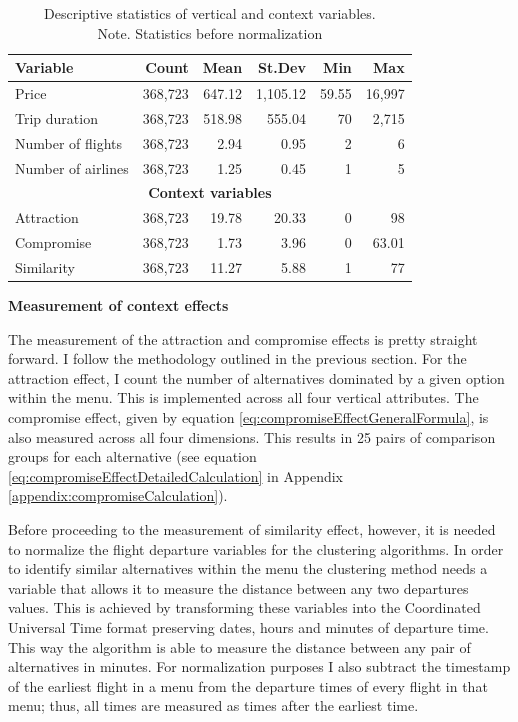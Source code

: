 \documentclass[a4paper,12pt]{article}
\begin{document}
\begin{table}[ht]
\centering
\begin{tabular}{lrrrrr}
\hline
Variable & Count & Mean & St.Dev & Min & Max \\
\hline
Price & 368,723 & 647.12 & 1,105.12 & 59.55 & 16,997 \\
Trip duration & 368,723 & 518.98 & 555.04 & 70 & 2,715 \\
Number of flights & 368,723 & 2.94 & 0.95 & 2 & 6 \\
Number of airlines & 368,723 & 1.25 & 0.45 & 1 & 5 \\
\hline
\multicolumn{6}{c}{\textbf{Context variables}} \\
\hline
Attraction & 368,723 & 19.78 & 20.33 & 0 & 98 \\
Compromise & 368,723 & 1.73 & 3.96 & 0 & 63.01 \\
Similarity & 368,723 & 11.27 & 5.88 & 1 & 77 \\
\hline
\end{tabular}
\caption{Descriptive statistics of vertical and context variables. \\ Note. Statistics before normalization}
\label{tab:descriptivesVerticalPlusContext}
\end{table}

\textbf{Measurement of context effects}

The measurement of the attraction and compromise effects is pretty straight forward. I follow the methodology outlined in the previous section. For the attraction effect, I count the number of alternatives dominated by a given option within the menu. This is implemented across all four vertical attributes. The compromise effect, given by equation \ref{eq:compromiseEffectGeneralFormula}, is also measured across all four dimensions. This results in 25 pairs of comparison groups for each alternative (see equation \ref{eq:compromiseEffectDetailedCalculation} in Appendix \ref{appendix:compromiseCalculation}). 

Before proceeding to the measurement of similarity effect, however, it is needed to normalize the flight departure variables for the clustering algorithms. In order to identify similar alternatives within the menu the clustering method needs a variable that allows it to measure the distance between any two departures values. This is achieved by transforming these variables into the Coordinated Universal Time format preserving dates, hours and minutes of departure time. This way the algorithm is able to measure the distance between any pair of alternatives in minutes. For normalization purposes I also subtract the timestamp of the earliest flight in a menu from the departure times of every flight in that menu; thus, all times are measured as times after the earliest time.
\end{document}
